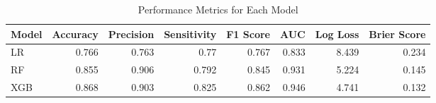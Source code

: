 \begin{table}[H]\centering
\caption{Performance Metrics for Each Model}
\label{Table 3 :performance_metrics}
\begin{tabular}{lrrrrrrr}
\toprule
Model & Accuracy & Precision & Sensitivity & F1 Score & AUC & Log Loss & Brier Score \\
\midrule
LR & 0.766 & 0.763 & 0.77 & 0.767 & 0.833 & 8.439 & 0.234 \\
RF & 0.855 & 0.906 & 0.792 & 0.845 & 0.931 & 5.224 & 0.145 \\
XGB & 0.868 & 0.903 & 0.825 & 0.862 & 0.946 & 4.741 & 0.132 \\
\bottomrule
\end{tabular}
\end{table}
